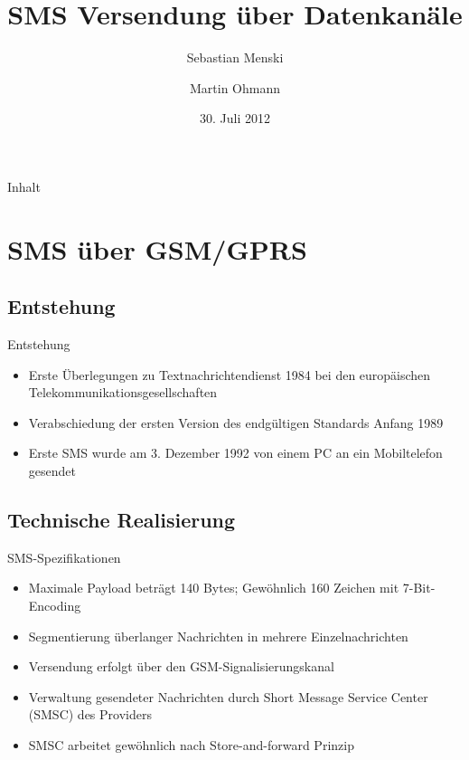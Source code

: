 \documentclass{beamer}
\title[SMS Versendung über Datenkanäle]{SMS Versendung über Datenkanäle}
\author{Sebastian Menski \and Martin Ohmann}
\institute{Institut für Informatik -- Universität Potsdam}
\date{30. Juli 2012}
\begin{document}
\begin{frame}
\titlepage
\end{frame}


\begin{frame}{Inhalt}
\tableofcontents
\end{frame}

\section{SMS über GSM/GPRS} %

\subsection{Entstehung}
\begin{frame}{Entstehung}
	\begin{itemize}
		\item Erste Überlegungen zu Textnachrichtendienst 1984 bei den 
			europäischen Telekommunikationsgesellschaften
		\item Verabschiedung der ersten Version des endgültigen Standards 
			Anfang 1989
		\item Erste SMS wurde am 3. Dezember 1992 von einem PC an ein 
			Mobiltelefon gesendet
	\end{itemize}
\end{frame}

\subsection{Technische Realisierung}
\begin{frame}{SMS-Spezifikationen}
	\begin{itemize}
		\item Maximale Payload beträgt 140 Bytes; Gewöhnlich 160 Zeichen mit 
			7-Bit-Encoding
		\item Segmentierung überlanger Nachrichten in mehrere Einzelnachrichten
		\item Versendung erfolgt über den GSM-Signalisierungskanal
		\item Verwaltung gesendeter Nachrichten durch Short Message Service 
			Center (SMSC) des Providers
		\item SMSC arbeitet gewöhnlich nach Store-and-forward Prinzip
	\end{itemize}
\end{frame}
\end{document}
